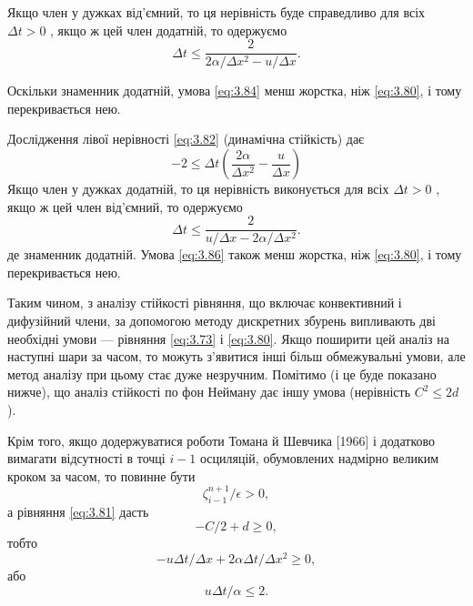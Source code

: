 Якщо член у дужках від'ємний, то ця нерівність буде справедливо для всіх $\Delta t > 0$ , якщо ж цей член додатній, то одержуємо
\begin{equation}
    \label{eq:3.84}
    \Delta t \le \frac{2}{2 \alpha / \Delta x^2 - u / \Delta x}.    
\end{equation}

Оскільки знаменник додатній, умова \eqref{eq:3.84} менш жорстка, ніж \eqref{eq:3.80}, і тому перекривається нею. \medskip

Дослідження лівої нерівності \eqref{eq:3.82} (динамічна стійкість) дає
\begin{equation}
    \label{eq:3.85}
    -2 \le \Delta t \left( \frac{2 \alpha}{\Delta x^2} - \frac{u}{\Delta x} \right)
\end{equation}
Якщо член у дужках додатній, то ця нерівність виконується для всіх $\Delta t > 0$ , якщо ж цей член від'ємний, то одержуємо
\begin{equation}
    \label{eq:3.86}
    \Delta t \le \frac{2}{u / \Delta x - 2 \alpha / \Delta x^2}.
\end{equation}
де знаменник додатній. Умова \eqref{eq:3.86} також менш жорстка, ніж \eqref{eq:3.80}, і тому перекривається нею. \medskip

Таким чином, з аналізу стійкості рівняння, що включає конвективний і дифузійний члени, за допомогою методу дискретних збурень випливають дві необхідні умови --- рівняння \eqref{eq:3.73} і \eqref{eq:3.80}. Якщо поширити цей аналіз на наступні шари за часом, то можуть з'явитися інші більш обмежувальні умови, але метод аналізу при цьому стає дуже незручним. Помітимо (і це буде показано нижче), що аналіз стійкості по фон Нейману дає іншу умова (нерівність $C^2 \le 2 d$). \medskip

Крім того, якщо додержуватися роботи Томана й Шевчика [1966] і додатково вимагати відсутності в точці $i - 1$ осциляцій, обумовлених надмірно великим  кроком за часом, то повинне бути
\begin{equation}
    \label{eq:3.87}
    \zeta_{i - 1}^{n + 1} / \epsilon > 0,
\end{equation}
а рівняння \eqref{eq:3.81} дасть
\begin{equation}
    \label{eq:3.88}
    - C / 2 + d \ge 0,
\end{equation}
тобто
\begin{equation}
    \label{eq:3.89}
    - u \Delta t / \Delta x + 2 \alpha \Delta t / \Delta x^2 \ge 0,
\end{equation}
або
\begin{equation}
    \label{eq:3.90}
    u \Delta t / \alpha \le 2.
\end{equation}

